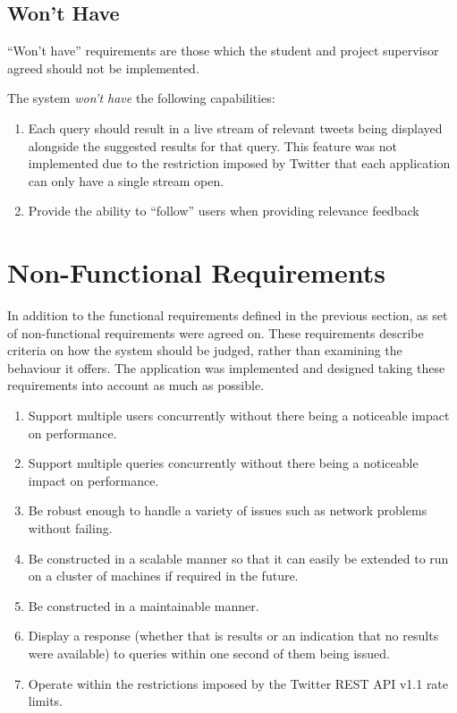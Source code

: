 \documentclass{l4proj}
\begin{document}
        \subsection{Won't Have}
        ``Won't have'' requirements are those which the student and project supervisor agreed should not be implemented.
        
        The system \textit{won't have} the following capabilities:
        \begin{enumerate}[label=\textbf{W.\arabic*}]
        \item Each query should result in a live stream of relevant tweets being displayed alongside the suggested results for that query. This feature was not implemented due to the restriction imposed by Twitter that each application can only have a single stream open.
        \item Provide the ability to ``follow'' users when providing relevance feedback
        \end{enumerate}



    \section{Non-Functional Requirements}
    
    In addition to the functional requirements defined in the previous section, as set of non-functional requirements were agreed on. These requirements describe criteria on how the system should be judged, rather than examining the behaviour it offers. The application was implemented and designed taking these requirements into account as much as possible.
    
    \begin{enumerate}[label=\textbf{N.\arabic*}]
    \item Support multiple users concurrently without there being a noticeable impact on performance.
    \item Support multiple queries concurrently without there being a noticeable impact on performance.
    \item Be robust enough to handle a variety of issues such as network problems without failing.
    \item Be constructed in a scalable manner so that it can easily be extended to run on a cluster of machines if required in the future.
    \item Be constructed in a maintainable manner.
    \item Display a response (whether that is results or an indication that no results were available) to queries within one second of them being issued.
    \item Operate within the restrictions imposed by the Twitter REST API v1.1 rate limits.

    \end{enumerate}
\end{document}
